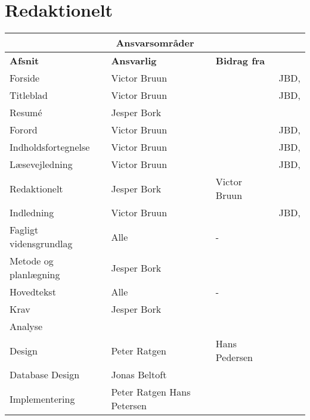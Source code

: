 \clearpage
\section{Redaktionelt}
\vfuzz=100pt
\hfuzz=100pt

\begin{table}[h!]
\centering
\label{tab:1}
    \begin{tabular}{|p{45mm}|p{26mm}|p{26mm}|p{26mm}|} \hline
    \multicolumn{4}{|c|}{\textbf{Ansvarsområder}} \\ \hline
        \textbf{Afsnit}        & \textbf{Ansvarlig} & \textbf{Bidrag fra} &\textbf{\raggedright Kontrolleret af}  \\\hline
        Forside                & Victor Bruun     &          & JBD, \\ \hline
        Titleblad              & Victor Bruun     &          & JBD, \\ \hline
        Resumé                 & Jesper Bork      &          &  \\ \hline
        Forord                 & Victor Bruun     &          & JBD,  \\ \hline
        Indholdsfortegnelse    & Victor Bruun     &          & JBD, \\ \hline
        Læsevejledning         & Victor Bruun     &          & JBD,  \\ \hline
        Redaktionelt           & Jesper Bork      & Victor Bruun         &  \\ \hline
        Indledning             & Victor Bruun     &          & JBD, \\ \hline
        Fagligt vidensgrundlag & Alle             & -        &  \\ \hline
        Metode og planlægning  & Jesper Bork      &          &  \\ \hline
        Hovedtekst             & Alle             & -        &  \\ \hline
        Krav                   & Jesper Bork      &          &  \\ \hline
        Analyse                &                  &              &  \\ \hline
        Design                 & Peter Ratgen     & Hans Pedersen&  \\ \hline
        Database Design        & Jonas Beltoft    &          &  \\ \hline
        Implementering         & Peter Ratgen \newline 
                                 Hans Petersen \newline

\end{tabular}
\end{table}
